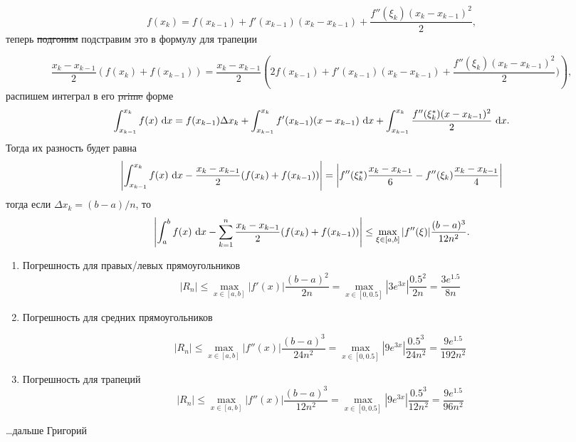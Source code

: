\documentclass{report}
\begin{document}
\begin{enumerate}
\[
f(x_k) = f(x_{k-1})+f'(x_{k-1})(x_k-x_{k-1})+\dfrac{f''(\xi_k)(x_k-x_{k-1})^2}{2},
\]
теперь \sout{подгоним} подстравим это в формулу для трапеции

\[
\dfrac{x_k-x_{k-1}}{2}(f(x_k)+f(x_{k-1})) = \dfrac{x_k-x_{k-1}}{2}\left(2f(x_{k-1})+f'(x_{k-1})(x_k-x_{k-1})+\dfrac{f''(\xi_k)(x_k-x_{k-1})^2}{2})\right),
\]
распишем интеграл в его \sout{prime} форме
\[
\int _{x_{k-1}}^{x_k} f(x) \, \dl x = f(x_{k-1})\Delta x_k + \int _{x_{k-1}}^{x_k} f'(x_{k-1})(x-x_{k-1}) \, \dl x + \int _{x_{k-1}}^{x_k} \dfrac{f''(\xi_k^*)(x-x_{k-1})^2}{2} \, \dl x.
\]
Тогда их разность будет равна
\[
    \left|\int_{x_{k-1}}^{x_k} f(x) \, \dl x - \dfrac{x_k-x_{k-1}}{2}(f(x_k)+f(x_{k-1}))\right| = \left|f''(\xi_k^*)\dfrac{x_k-x_{k-1}}{6} - f''(\xi_k)\dfrac{x_k-x_{k-1}}{4}\right|
\]
тогда если $\Delta x_k = (b-a)/n$, то
\[
    \left|\int_{a}^{b} f(x) \, \dl x - \sum_{k=1}^{n} \dfrac{x_k-x_{k-1}}{2}(f(x_k)+f(x_{k-1}))\right| \le \max_{\xi \in [a, b]}|f''(\xi)|\dfrac{(b-a)^3}{12n^2}.
\]

\end{enumerate}

\begin{enumerate}
\item
\noindent Погрешность для правых/левых прямоугольников
\[
    |R_n| \le \max_{x\in[a, b]}|f'(x)|\dfrac{(b-a)^2}{2n} = \max_{x\in[0, 0.5]}|3e^{3x}|\dfrac{0.5^2}{2n} = \dfrac{3e^{1.5}}{8n}
\]

\item 
\noindent Погрешность для средних прямоугольников

\[
|R_n| \le \max_{x\in [a, b]}|f''(x)|\dfrac{(b-a)^3}{24n^2} = \max_{x\in[0, 0.5]}|9e^{3x}|\dfrac{0.5^3}{24n^2} = \dfrac{9e^{1.5}}{192n^2}
\]
\item 
\noindent Погрешность для трапеций
\[
|R_n| \le \max_{x\in [a, b]}|f''(x)|\dfrac{(b-a)^3}{12n^2} = \max_{x\in[0, 0.5]}|9e^{3x}|\dfrac{0.5^3}{12n^2} = \dfrac{9e^{1.5}}{96n^2}
\]

\end{enumerate}
\dots дальше Григорий
\end{document}
